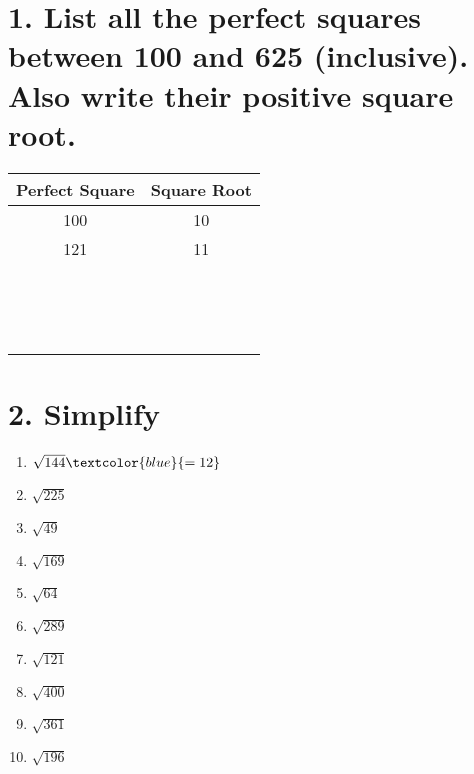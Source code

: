 \documentclass{hw}
\begin{document}
\section*{\normalsize 1. List all the perfect squares between 100 and 625 (inclusive). Also write their positive square root.}
\renewcommand{\arraystretch}{2} %
\begin{center}
\begin{tabular}{|c|c|}
    \hline
    Perfect Square & Square Root \\
    \hline
    100 & 10 \\
    \hline
    121 & 11 \\
    \hline
    & \\
    \hline
    & \\
    \hline
    & \\
    \hline
    & \\
    \hline
    & \\
    \hline
    & \\
    \hline
    & \\
    \hline
    & \\
    \hline
    & \\
    \hline
    & \\
    \hline
    & \\
    \hline
    & \\
    \hline
    & \\
    \hline
    & \\
    \hline
    & \\
    \hline
\end{tabular}
\end{center}

\section*{\normalsize 2. Simplify}
\begin{enumerate}[label=\alph*.]
    \item $\sqrt{144} \textcolor{blue}{= 12}$
        \studentsmallworkspace
    \item $\sqrt{225}$
        \studentsmallworkspace
    \item $\sqrt{49}$
        \studentsmallworkspace
    \item $\sqrt{169}$
        \studentsmallworkspace
    \item $\sqrt{64}$
        \studentsmallworkspace
    \item $\sqrt{289}$
        \studentsmallworkspace
    \item $\sqrt{121}$
        \studentsmallworkspace
    \item $\sqrt{400}$
        \studentsmallworkspace
    \item $\sqrt{361}$
        \studentsmallworkspace
    \item $\sqrt{196}$
        \studentsmallworkspace
\end{enumerate}
\end{document}
